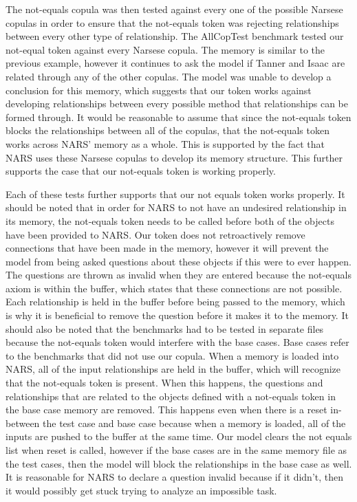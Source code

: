 \documentclass[conference]{IEEEtran}
\begin{document}
	The not-equals copula was then tested against every one of the possible Narsese copulas in order to ensure that the not-equals token was rejecting relationships between every other type of relationship. The AllCopTest benchmark tested our not-equal token against every Narsese copula. The memory is similar to the previous example, however it continues to ask the model if Tanner and Isaac are related through any of the other copulas. The model was unable to develop a conclusion for this memory, which suggests that our token works against developing relationships between every possible method that relationships can be formed through. It would be reasonable to assume that since the not-equals token blocks the relationships between all of the copulas, that the not-equals token works across NARS' memory as a whole. This is supported by the fact that NARS uses these Narsese copulas to develop its memory structure. This further supports the case that our not-equals token is working properly.
	
	Each of these tests further supports that our not equals token works properly. It should be noted that in order for NARS to not have an undesired relationship in its memory, the not-equals token needs to be called before both of the objects have been provided to NARS. Our token does not retroactively remove connections that have been made in the memory, however it will prevent the model from being asked questions about these objects if this were to ever happen. The questions are thrown as invalid when they are entered because the not-equals axiom is within the buffer, which states that these connections are not possible. Each relationship is held in the buffer before being passed to the memory, which is why it is beneficial to remove the question before it makes it to the memory. It should also be noted that the benchmarks had to be tested in separate files because the not-equals token would interfere with the base cases. Base cases refer to the benchmarks that did not use our copula. When a memory is loaded into NARS, all of the input relationships are held in the buffer, which will recognize that the not-equals token is present. When this happens, the questions and relationships that are related to the objects defined with a not-equals token in the base case memory are removed. This happens even when there is a reset in-between the test case and base case because when a memory is loaded, all of the inputs are pushed to the buffer at the same time. Our model clears the not equals list when reset is called, however if the base cases are in the same memory file as the test cases, then the model will block the relationships in the base case as well. It is reasonable for NARS to declare a question invalid because if it didn't, then it would possibly get stuck trying to analyze an impossible task. 
	
\end{document}
